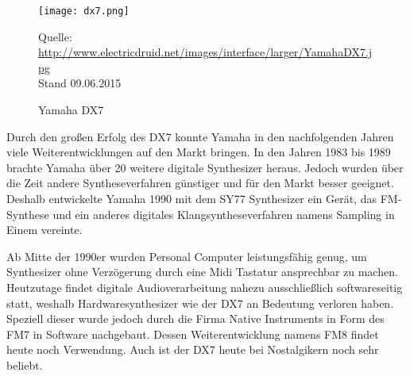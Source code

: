  \begin{figure} [ht]
\centering
  \texttt{[image: dx7.png]}
\caption{Yamaha DX7}
\label{fig:dx7}
Quelle: \url{http://www.electricdruid.net/images/interface/larger/YamahaDX7.jpg}
\\Stand 09.06.2015
\end{figure}

Durch den großen Erfolg des DX7 konnte Yamaha in den nachfolgenden Jahren viele Weiterentwicklungen auf den Markt bringen. In den Jahren 1983 bis 1989 brachte Yamaha über 20 weitere digitale Synthesizer heraus. Jedoch wurden über die Zeit andere Syntheseverfahren günstiger und für den Markt besser geeignet. Deshalb entwickelte Yamaha 1990 mit dem SY77 Synthesizer ein Gerät, das FM-Synthese und ein anderes digitales Klangsyntheseverfahren namens Sampling in Einem vereinte.\cite{fmGS1}

Ab Mitte der 1990er wurden Personal Computer leistungsfähig genug, um Synthesizer ohne Verzögerung durch eine Midi Tastatur ansprechbar zu machen. Heutzutage findet digitale Audioverarbeitung nahezu ausschließlich softwareseitig statt, weshalb Hardwaresynthesizer wie der DX7 an Bedeutung verloren haben. Speziell dieser wurde jedoch durch die Firma Native Instruments in Form des FM7 in Software nachgebaut. Dessen Weiterentwicklung namens FM8 findet heute noch Verwendung. Auch ist der DX7 heute bei Nostalgikern noch sehr beliebt.\cite{fmGS1}